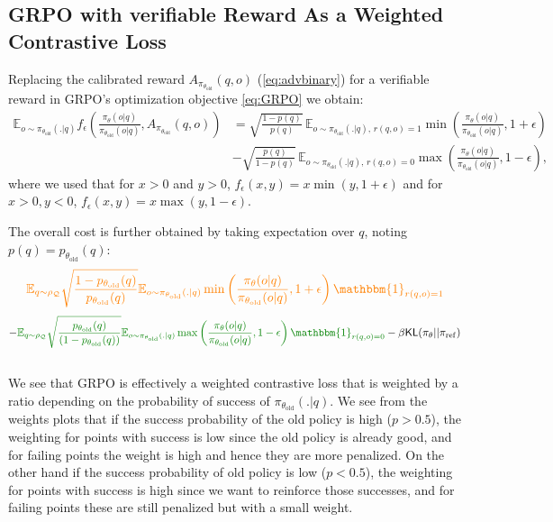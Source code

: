 \documentclass[11pt,reqno]{amsart}
\begin{document}
\subsection{GRPO with verifiable Reward As a Weighted Contrastive Loss}

Replacing the calibrated reward $A_{\pi_{\theta_{\text{old}}}}(q,o)$ (\eqref{eq:advbinary}) for a verifiable reward in GRPO's optimization objective \eqref{eq:GRPO} we obtain:  
\begin{align*}
\mathbb{E}_{o\sim \pi_{\theta_{\text{old}}} (. |q) } f_{\epsilon}\left( \frac{\pi_{\theta} (o| q )}{\pi_{\theta_{\text{old}}}(o| q) }, A_{\pi_{\theta_{\text{old}}}}(q,o) \right) &= \sqrt{\frac{1-p(q)}{p(q)}} \, \mathbb{E}_{o\sim \pi_{\theta_{\text{old}}} (. |q),\, r(q,o)=1} \min\left(\frac{\pi_{\theta} (o| q )}{\pi_{\theta_{\text{old}}}(o| q)}, 1+\epsilon \right)\\
&- \sqrt{\frac{p(q)}{1-p(q)}} \, \mathbb{E}_{o\sim \pi_{\theta_{\text{old}}} (. |q),\, r(q,o)=0} \max\left(\frac{\pi_{\theta} (o| q )}{\pi_{\theta_{\text{old}}}(o| q)}, 1-\epsilon \right),
\end{align*}
where we used that for $x>0$ and $y>0$, $f_{\epsilon}(x,y)=x\min(y,1+\epsilon)$ and for $x>0,y<0$, $f_{\epsilon}(x,y)=x\max(y,1-\epsilon)$.

The overall cost is further obtained by taking expectation over $q$, noting $p(q)= p_{\theta_{\text{old}}} (q) $:
$$\textcolor{orange}{ \mathbb{E}_{q\sim \rho_{\mathcal{Q}}} \sqrt{\frac{1-p_{\theta_{\text{old}}} (q) }{p_{\theta_{\text{old}}} (q) }} \mathbb{E}_{o\sim \pi_{\theta_{\text{old}}} (. |q) } \min\left(\frac{\pi_{\theta} (o| q )}{\pi_{\theta_{\text{old}}}(o| q)},1+\epsilon \right)\mathbbm{1}_{r(q,o)=1}}$$
$$-\textcolor{darkgreen}{\mathbb{E}_{q\sim \rho_{\mathcal{Q}}} \sqrt{\frac{p_{\theta_{\text{old}}} (q) }{(1-p_{\theta_{\text{old}}} (q) )}} \mathbb{E}_{o\sim \pi_{\theta_{\text{old}}} (. |q) } \max \left(\frac{\pi_{\theta} (o| q )}{\pi_{\theta_{\text{old}}}(o| q)}, 1-\epsilon \right ) \mathbbm{1}_{r(q,o)=0} }- \beta \mathsf{KL} (\pi_{\theta} || \pi_{\mathrm{ref}}) $$
~\\
\noindent We see that GRPO is effectively a weighted contrastive loss that is weighted by a ratio depending on the probability of success of $\pi_{\theta_{\text{old}}} (.|q)$.
We see  from the weights plots  that if the success probability of the old policy is high  ($p >0.5$), the weighting for points with success is low since the old policy is already good, and for failing points the weight is high and hence they are more penalized.
On the other hand if the success probability of old policy is low ($p<0.5$), the weighting for points with success is high since we want to reinforce those successes, and for failing points these are still penalized but with a small weight. 
\end{document}
